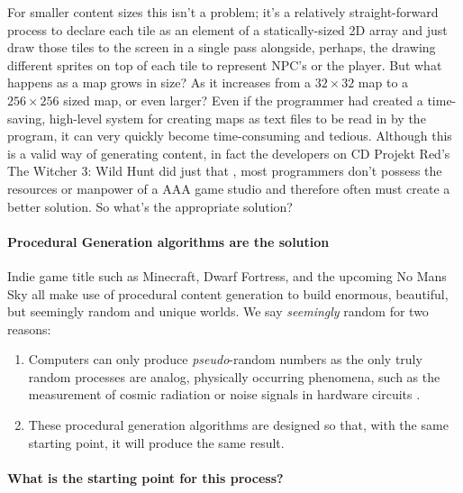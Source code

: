 \documentclass{article}
\begin{document}
For smaller content sizes this isn't a problem; it's a relatively straight-forward process to declare each tile as an element of a statically-sized 2D array and just draw those tiles to the screen in a single pass alongside, perhaps, the drawing different sprites on top of each tile to represent NPC's or the player. But what happens as a map grows in size? As it increases from a $32 \times 32$ map to a $256 \times 256$ sized map, or even larger? Even if the programmer had created a time-saving, high-level system for creating maps as text files to be read in by the program, it can very quickly become time-consuming and tedious. Although this is a valid way of generating content, in fact the developers on CD Projekt Red's The Witcher 3: Wild Hunt did just that \parencite{witcher}, most programmers don't possess the resources or manpower of a AAA game studio and therefore often must create a better solution. So what's the appropriate solution?
		
\paragraph{Procedural Generation algorithms are the solution}\mbox{}
		
Indie game title such as Minecraft, Dwarf Fortress, and the upcoming No Mans Sky all make use of procedural content generation to build enormous, beautiful, but seemingly random and unique worlds. We say \emph{seemingly} random for two reasons:
\begin{enumerate}
\item
Computers can only produce \emph{pseudo}-random numbers as the only truly random processes are analog, physically occurring phenomena, such as the measurement of cosmic radiation or noise signals in hardware circuits \parencite{guneysu}.
\item
These procedural generation algorithms are designed so that, with the same starting point, it will produce the same result.
\end{enumerate}
		
\paragraph{What is the starting point for this process?}\mbox{}
		
\end{document}
